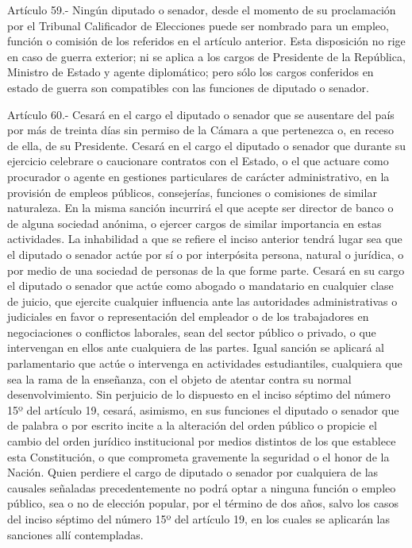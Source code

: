     Artículo 59.- Ningún diputado o senador, desde el momento de su proclamación por el Tribunal Calificador de Elecciones puede ser nombrado para un empleo, función o comisión de los referidos en el artículo anterior.
    Esta disposición no rige en caso de guerra exterior; ni se aplica a los cargos de Presidente de la República, Ministro de Estado y agente diplomático; pero sólo los cargos conferidos en estado de guerra son compatibles con las funciones de diputado o senador.



    Artículo 60.- Cesará en el cargo el diputado o senador que se ausentare del país por más de treinta días sin permiso de la Cámara a que pertenezca o, en receso de ella, de su Presidente.
    Cesará en el cargo el diputado o senador que durante su ejercicio celebrare o caucionare contratos con el Estado, o el que actuare como procurador o agente en gestiones particulares de carácter administrativo, en la provisión de empleos públicos, consejerías, funciones o comisiones de similar naturaleza. En la misma sanción incurrirá el que acepte ser director de banco o de alguna sociedad anónima, o ejercer cargos de similar importancia en estas actividades.
    La inhabilidad a que se refiere el inciso anterior tendrá lugar sea que el diputado o senador actúe por sí o por interpósita persona, natural o jurídica, o por medio de una sociedad de personas de la que forme parte.
    Cesará en su cargo el diputado o senador que actúe como abogado o mandatario en cualquier clase de juicio, que ejercite cualquier influencia ante las autoridades administrativas o judiciales en favor o representación del empleador o de los trabajadores en negociaciones o conflictos laborales, sean del sector público o privado, o que intervengan en ellos ante cualquiera de las partes. Igual sanción se aplicará al parlamentario que actúe o intervenga en actividades estudiantiles, cualquiera que sea la rama de la enseñanza, con el objeto de atentar contra su normal desenvolvimiento.
    Sin perjuicio de lo dispuesto en el inciso séptimo del número 15º del artículo 19, cesará, asimismo, en sus funciones el diputado o senador que de palabra o por escrito incite a la alteración del orden público o propicie el cambio del orden jurídico institucional por medios distintos de los que establece esta Constitución, o que comprometa gravemente la seguridad o el honor de la Nación.
    Quien perdiere el cargo de diputado o senador por cualquiera de las causales señaladas precedentemente no podrá optar a ninguna función o empleo público, sea o no de elección popular, por el término de dos años, salvo los casos del inciso séptimo del número 15º del artículo 19, en los cuales se aplicarán las sanciones allí contempladas.
